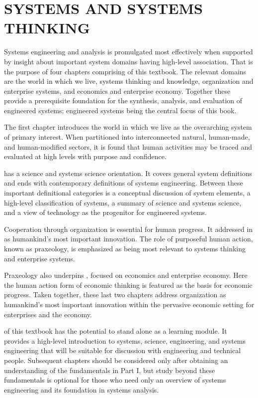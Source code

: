 \part{SYSTEMS AND SYSTEMS THINKING}\label{part:1}

Systems engineering and analysis is promulgated most effectively when supported by insight about important system domains having high-level association.  That is the purpose of four chapters comprising  of this textbook.  The relevant domains are the world in which we live, systems thinking and knowledge, organization and enterprise systems, and economics and enterprise economy. Together these provide a prerequisite foundation for the synthesis, analysis, and evaluation of engineered systems; engineered systems being the central focus of this book.
	
The first chapter introduces the world in which we live as the overarching system of primary interest. When partitioned into interconnected natural, human-made, and human-modified sectors, it is found that human activities may be traced and evaluated at high levels with purpose and confidence.
	
 has a science and systems science orientation.  It covers general system definitions and ends with contemporary definitions of systems engineering.  Between these important definitional categories is a conceptual discussion of system elements, a high-level classification of systems, a summary of science and systems science, and a view of technology as the progenitor for engineered systems.
	
Cooperation through organization is essential for human progress. It addressed in  as humankind’s most important innovation. The role of purposeful human action, known as praxeology, is emphasized as being most relevant to systems thinking and enterprise systems.
	
Praxeology also underpins , focused on economics and enterprise economy.  Here the human action form of economic thinking is featured as the basis for economic progress. Taken together, these last two chapters address organization as humankind’s most important innovation within the pervasive economic setting for enterprises and the economy.

 of this textbook has the potential to stand alone as a learning module.  It provides a high-level introduction to systems, science, engineering, and systems engineering that will be suitable for discussion with engineering and technical people.  Subsequent chapters should be considered only after obtaining an understanding of the fundamentals in Part I, but study beyond these fundamentals is optional for those who need only an overview of systems engineering and its foundation in systems analysis.
